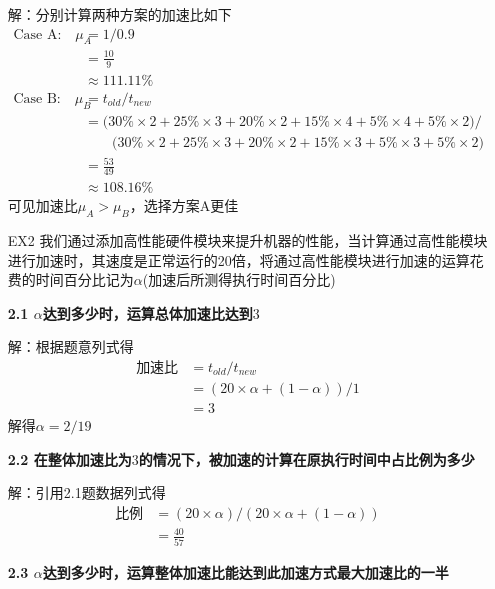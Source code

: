 \documentclass[12pt,a4paper,utf8]{ctexart}
\begin{document}
\begin{enumerate}
解：分别计算两种方案的加速比如下
\begin{equation}
	\begin{aligned}
		\mbox{Case A:} \quad \mu_A 	&= 1 / 0.9 \\
								&= \frac{10}{9} \\
								&\approx 111.11\% \\
		\mbox{Case B:} \quad \mu_B	&= t_{old} / t_{new} \\
									&= \bigg( 30\% \times 2 + 25\% \times 3 + 20\%\times 2 + 15\% \times 4 + 5\% \times 4 + 5\% \times 2 \bigg)  \bigg/ \\ 
									&\qquad \bigg( 30\% \times 2 + 25\% \times 3 + 20\%\times 2 + 15\% \times 3 + 5\% \times 3 + 5\% \times 2\bigg) \\
								&= \frac{53}{49} \\
								&\approx 108.16\%
	\end{aligned}
	\nonumber
\end{equation}
可见加速比$ \mu_A > \mu_B $，选择方案A更佳

\item[EX2] %
我们通过添加高性能硬件模块来提升机器的性能，当计算通过高性能模块进行加速时，其速度是正常运行的20倍，将通过高性能模块进行加速的运算花费的时间百分比记为$ \alpha $(加速后所测得执行时间百分比)

\textbf{2.1 $\alpha $达到多少时，运算总体加速比达到$3$}

解：根据题意列式得
\begin{equation}
	\begin{aligned}
		\mbox{加速比} &= t_{old} / t_{new} \\
						&= (20 \times \alpha + (1 - \alpha)) / 1 \\
						&= 3
	\end{aligned}
	\nonumber
\end{equation}
解得$\alpha = 2/19$

\textbf{2.2 在整体加速比为$3$的情况下，被加速的计算在原执行时间中占比例为多少}

解：引用2.1题数据列式得
\begin{equation}
	\begin{aligned}
		\mbox{比例} &= (20 \times \alpha ) / (20 \times \alpha + (1 - \alpha)) \\
					&= \frac{40}{57}
	\end{aligned}
	\nonumber
\end{equation}

\textbf{2.3 $\alpha $达到多少时，运算整体加速比能达到此加速方式最大加速比的一半}


\end{enumerate}
\end{document}
